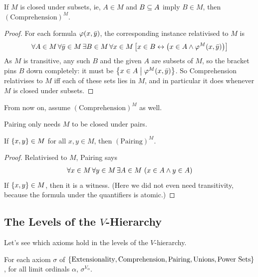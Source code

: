 \begin{boxlemma}[Comprehension]
    If $M$ is closed under subsets, ie, $A \in M$ and $B \subseteq A$ imply $B \in M$, then $(\text{Comprehension})^M$.
\end{boxlemma}
\begin{proof} %
    For each formula $\varphi\!\left( x, \bar{y} \right)$, the corresponding instance relativised to $M$ is
    \begin{align*}
        \forall A \in M \, \forall \bar{y} \in M \, \exists B \in M \, \forall x \in M \left[ x \in B \leftrightarrow \left( x \in A \land \varphi^M\!\left( x, \bar{y} \right) \right) \right]
    \end{align*}
    As $M$ is transitive, any such $B$ and the given $A$ are subsets of $M$, so the bracket pins $B$ down completely: it must be $\left\{ x \in A \; \middle\vert \; \varphi^M\!\left( x, \bar{y} \right) \right\}$. So Comprehension relativises to $M$ iff each of these sets lies in $M$, and in particular it does whenever $M$ is closed under subsets.
\end{proof}

From now on, assume $(\text{Comprehension})^M$ as well.

Pairing only needs $M$ to be closed under pairs.

\begin{boxlemma}[Pairing]
    If $\left\{ x, y \right\} \in M$ for all $x, y \in M$, then $(\text{Pairing})^M$.
\end{boxlemma}
\begin{proof} %
    Relativised to $M$, Pairing says
    \begin{align*}
        \forall x \in M \, \forall y \in M \, \exists A \in M \, \left( x \in A \land y \in A \right)
    \end{align*}
    If $\left\{ x, y \right\} \in M$, then it is a witness. (Here we did not even need transitivity, because the formula under the quantifiers is atomic.)
\end{proof}

\subsection{The Levels of the $V$-Hierarchy}

Let's see which axioms hold in the levels of the $V$-hierarchy.

\begin{boxproposition}
    For each axiom $\sigma$ of $\left\{ \text{Extensionality}, \text{Comprehension}, \text{Pairing}, \text{Unions}, \text{Power Sets} \right\}$, for all limit ordinals $\alpha$, $\sigma^{V_{\alpha}}$.
\end{boxproposition}

